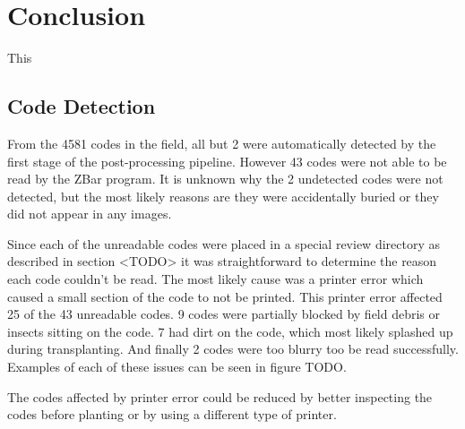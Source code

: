 
\cleardoublepage

\chapter{Conclusion}
\label{conclusion}

This 





\section{Code Detection}

From the 4581 codes in the field, all but 2 were automatically detected by the first stage of the post-processing pipeline.  However 43 codes were not able to be read by the ZBar program.  It is unknown why the 2 undetected codes were not detected, but the most likely reasons are they were accidentally buried or they did not appear in any images.  

Since each of the unreadable codes were placed in a special review directory as described in section <TODO> it was straightforward to determine the reason each code couldn't be read.  The most likely cause was a printer error which caused a small section of the code to not be printed.  This printer error affected 25 of the 43 unreadable codes.  9 codes were partially blocked by field debris or insects sitting on the code.  7 had dirt on the code, which most likely splashed up during transplanting. And finally 2 codes were too blurry too be read successfully.  Examples of each of these issues can be seen in figure TODO. 

The codes affected by printer error could be reduced by better inspecting the codes before planting or by using a different type of printer.


